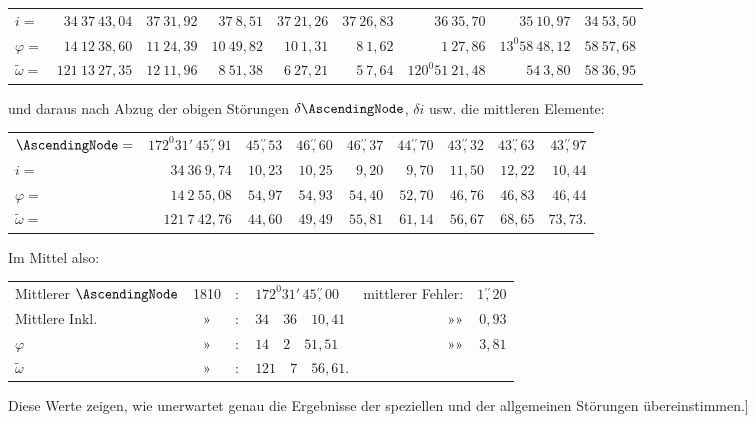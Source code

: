 \begin{landscape}
\begin{center}
\begin{tabular}{@{}lr|r|r|r|r|r|r|r@{}}
\(i=\)&\(34\ 37\ 43{,}04\)&\(37\ 31{,}92\)&\(37\ 8{,}51\)&\(37\ 21{,}26\)&\(37\ 26{,}83\)&\(36\ 35{,}70\)&\(35\ 10{,}97\)&\(34\ 53{,}50\)\\
\(\varphi=\)&\(14\ 12\ 38{,}60\)&\(11\ 24{,}39\)&\(10\ 49{,}82\)&\(10\ 1{,}31\)&\(8\ 1{,}62\)&\(1\ 27{,}86\)&\(13^0 58\ 48{,}12\)&\(58\ 57{,}68\)\\
\(\tilde\omega=\)&\(121\ 13\ 27{,}35\)&\(12\ 11{,}96\)&\(8\ 51{,}38\)&\(6\ 27{,}21\)&\(5\ 7{,}64\)&\(120^0 51\ 21{,}48\)&\(54\ 3{,}80\)&\(58\ 36{,}95\)
\end{tabular}
\endgroup
\end{center}
und daraus nach Abzug der obigen Störungen \(\delta\AscendingNode\), \(\delta i\) usw. die mittleren Elemente:
\begin{center}
\begingroup\fontsize{8}{10}\selectfont\setlength{\tabcolsep}{3pt}
\begin{tabular}{@{}lr|r|r|r|r|r|r|r@{}}
\(\AscendingNode=\)&\(172^0 31'\,45\overset{\prime\prime}{,}91\)&\(45\overset{\prime\prime}{,}53\)&\(46\overset{\prime\prime}{,}60\)&\(46\overset{\prime\prime}{,}37\)&\(44\overset{\prime\prime}{,}70\)&\(43\overset{\prime\prime}{,}32\)&\(43\overset{\prime\prime}{,}63\)&\(43\overset{\prime\prime}{,}97\)\\
\(i=\)&\(34\ 36\ 9{,}74\)&\(10{,}23\)&\(10{,}25\)&\(9{,}20\)&\(9{,}70\)&\(11{,}50\)&\(12{,}22\)&\(10{,}44\)\\
\(\varphi=\)&\(14\ 2\ 55{,}08\)&\(54{,}97\)&\(54{,}93\)&\(54{,}40\)&\(52{,}70\)&\(46{,}76\)&\(46{,}83\)&\(46{,}44\)\\
\(\tilde\omega=\)&\(121\ 7\ 42{,}76\)&\(44{,}60\)&\(49{,}49\)&\(55{,}81\)&\(61{,}14\)&\(56{,}67\)&\(68{,}65\)&\(73{,}73.\)
\end{tabular}
\endgroup
\end{center}
Im Mittel also:
\begin{center}
\begin{tabular}{@{}lcrlrr@{}}
Mittlerer \(\AscendingNode\)&1810&\(:\)&\(172^0 31'\,45\overset{\prime\prime}{,}00\)&mittlerer Fehler:&\(1\overset{\prime\prime}{,}20\)\\
Mittlere Inkl.&»&\(:\)&\(34\quad36\quad10{,}41\)&»\qquad »&\(0{,}93\)\\
\(\varphi\)&»&\(:\)&\(14\quad2\quad51{,}51\)&»\qquad »&\(3{,}81\)\\
\(\tilde\omega\)&»&\(:\)&\(121\quad7\quad56{,}61.\)&&
\end{tabular}
\end{center}
Diese Werte zeigen, wie unerwartet genau die Ergebnisse der speziellen und der allgemeinen Störungen übereinstimmen.]
\endgroup
\clearpage
\endgroup
\end{landscape}
